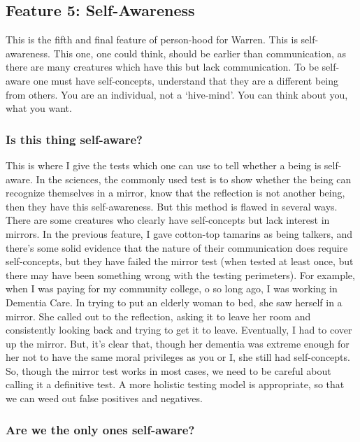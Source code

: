 \subsection{Feature 5: Self-Awareness}

This is the fifth and final feature of person-hood for Warren. This is self-awareness. This one, one could think, should be earlier than communication, as there are many creatures which have this but lack communication. To be self-aware one must have self-concepts, understand that they are a different being from others. You are an individual, not a `hive-mind'. You can think about you, what you want.
\subsubsection{Is this thing self-aware?}

This is where I give the tests which one can use to tell whether a being is self-aware. In the sciences, the commonly used test is to show whether the being can recognize themselves in a mirror, know that the reflection is not another being, then they have this self-awareness.  But this method is flawed in several ways. There are some creatures who clearly have self-concepts but lack interest in mirrors. In the previous feature, I gave cotton-top tamarins as being talkers, and there's some solid evidence that the nature of their communication does require self-concepts, but they have failed the mirror test (when tested at least once, but there may have been something wrong with the testing perimeters). For example, when I was paying for my community college, o so long ago, I was working in Dementia Care. In trying to put an elderly woman to bed, she saw herself in a mirror. She called out to the reflection, asking  it to leave her room and consistently looking back and trying to get it to leave. Eventually, I had to cover up the mirror. But, it's clear that, though her dementia was extreme enough for her not to have the same moral privileges as you or I, she still had self-concepts.  So, though the mirror test works in most cases, we need to be careful about calling it a definitive test. A more holistic testing model is appropriate, so that we can weed out false positives and negatives.  
\subsubsection{Are we the only ones self-aware?}

